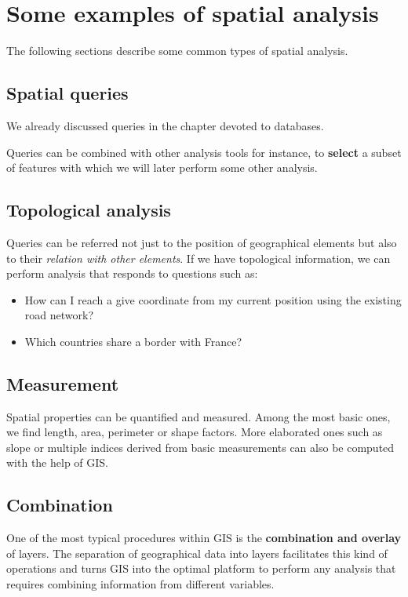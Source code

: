 \section{Some examples of spatial analysis}

The following sections describe some common types of spatial analysis.

\subsection{Spatial queries}

We already discussed queries in the chapter devoted to databases.

Queries can be combined with other analysis tools for instance, to \textbf{select} a subset of features with which we will later perform some other analysis.

\subsection{Topological analysis}

Queries can be referred not just to the position of geographical elements but also to their \emph{relation with other elements}. If we have topological information, we can perform analysis that responds to questions such as:

\begin{itemize}
\item How can I reach a give coordinate from my current position using the existing road network? 

\item Which countries share a border with France?
\end{itemize}

\subsection{Measurement} 

Spatial properties can be quantified and measured. Among the most basic ones, we find length, area, perimeter or shape factors. More elaborated ones such as slope or multiple indices derived from basic measurements can also be computed with the help of GIS.


\subsection{Combination}

One of the most typical procedures within GIS is the \textbf{combination and overlay} of layers. The separation of geographical data into layers facilitates this kind of operations and turns GIS into the optimal platform to perform any analysis that requires combining information from different variables.

